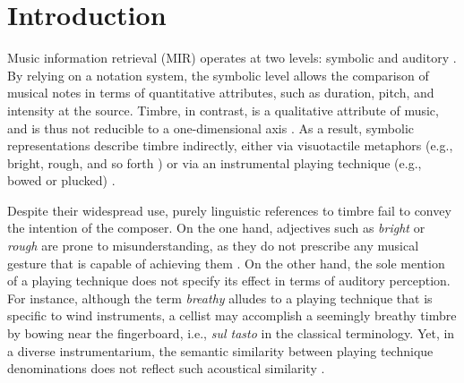 \documentclass{bmcart}
\makeatletter
\newcommand*{\eg}{e.g.,\@\xspace}
\makeatother
\begin{document}




\section*{Introduction}
\label{sec:intro}

Music information retrieval (MIR) operates at two levels: symbolic and auditory \cite{downie2003mir}.
By relying on a notation system, the symbolic level allows the comparison of musical notes in terms of quantitative attributes, such as duration, pitch, and intensity at the source.
Timbre, in contrast, is a qualitative attribute of music, and is thus not reducible to a one-dimensional axis \cite{siedenburg2019chapter}.
As a result, symbolic representations describe timbre indirectly, either via visuotactile metaphors (\eg{} bright, rough, and so forth \cite{faure1996icmpc}) or via an instrumental playing technique (\eg{} bowed or plucked) \cite{lostanlen2018extended}.

Despite their widespread use, purely linguistic references to timbre fail to convey the intention of the composer.
On the one hand, adjectives such as \emph{bright} or \emph{rough} are prone to misunderstanding, as they do not prescribe any musical gesture that is capable of achieving them \cite{antoine2018isma}.
On the other hand, the sole mention of a playing technique does not specify its effect in terms of auditory perception.
For instance, although the term \emph{breathy} alludes to a playing technique that is specific to wind instruments, a cellist may accomplish a seemingly breathy timbre by bowing near the fingerboard, i.e., \emph{sul tasto} in the classical terminology.
Yet, in a diverse instrumentarium, the semantic similarity between playing technique denominations does not reflect such acoustical similarity \cite{kolozali2011ismir}.
\end{document}
